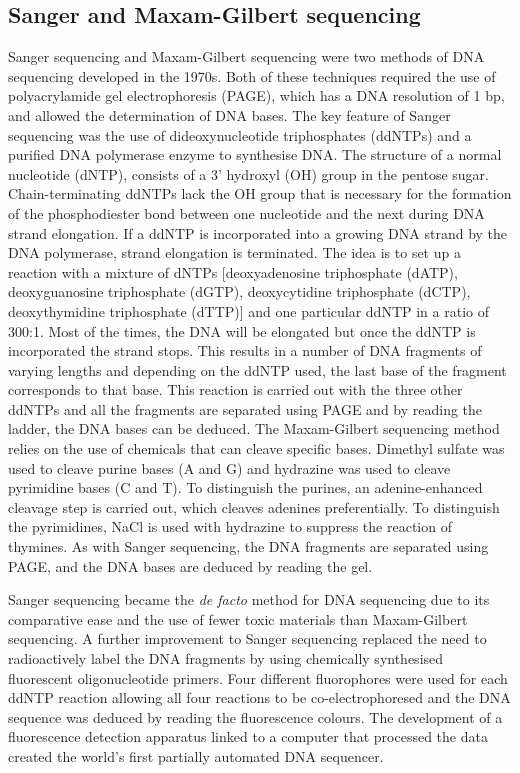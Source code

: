 \subsection{Sanger and Maxam-Gilbert sequencing}

Sanger sequencing\cite{pmid271968} and Maxam-Gilbert sequencing\cite{pmid265521} were two methods of DNA sequencing developed in the 1970s. Both of these techniques required the use of polyacrylamide gel electrophoresis (PAGE), which has a DNA resolution of 1 bp, and allowed the determination of DNA bases. The key feature of Sanger sequencing was the use of dideoxynucleotide triphosphates (ddNTPs) and a purified DNA polymerase enzyme to synthesise DNA. The structure of a normal nucleotide (dNTP), consists of a 3' hydroxyl (OH) group in the pentose sugar. Chain-terminating ddNTPs lack the OH group that is necessary for the formation of the phosphodiester bond between one nucleotide and the next during DNA strand elongation. If a ddNTP is incorporated into a growing DNA strand by the DNA polymerase, strand elongation is terminated. The idea is to set up a reaction with a mixture of dNTPs [deoxyadenosine triphosphate (dATP), deoxyguanosine triphosphate (dGTP), deoxycytidine triphosphate (dCTP), deoxythymidine triphosphate (dTTP)] and one particular ddNTP in a ratio of 300:1. Most of the times, the DNA will be elongated but once the ddNTP is incorporated the strand stops. This results in a number of DNA fragments of varying lengths and depending on the ddNTP used, the last base of the fragment corresponds to that base. This reaction is carried out with the three other ddNTPs and all the fragments are separated using PAGE and by reading the ladder, the DNA bases can be deduced. The Maxam-Gilbert sequencing method relies on the use of chemicals that can cleave specific bases. Dimethyl sulfate was used to cleave purine bases (A and G) and hydrazine was used to cleave pyrimidine bases (C and T). To distinguish the purines, an adenine-enhanced cleavage step is carried out, which cleaves adenines preferentially. To distinguish the pyrimidines, NaCl is used with hydrazine to suppress the reaction of thymines. As with Sanger sequencing, the DNA fragments are separated using PAGE, and the DNA bases are deduced by reading the gel.

Sanger sequencing became the \textit{de facto} method for DNA sequencing due to its comparative ease and the use of fewer toxic materials than Maxam-Gilbert sequencing. A further improvement to Sanger sequencing replaced the need to radioactively label the DNA fragments by using chemically synthesised fluorescent oligonucleotide primers\cite{pmid3713851}. Four different fluorophores were used for each ddNTP reaction allowing all four reactions to be co-electrophoresed and the DNA sequence was deduced by reading the fluorescence colours. The development of a fluorescence detection apparatus linked to a computer that processed the data created the world's first partially automated DNA sequencer\cite{pmid3713851}.

